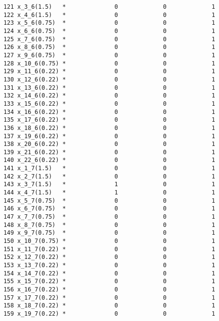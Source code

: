 \documentclass{article}[A4]
\begin{document}
\begin{verbatim}
	   121 x_3_6(1.5)   *              0             0             1 
	   122 x_4_6(1.5)   *              0             0             1 
	   123 x_5_6(0.75)  *              0             0             1 
	   124 x_6_6(0.75)  *              0             0             1 
	   125 x_7_6(0.75)  *              0             0             1 
	   126 x_8_6(0.75)  *              0             0             1 
	   127 x_9_6(0.75)  *              0             0             1 
	   128 x_10_6(0.75) *              0             0             1 
	   129 x_11_6(0.22) *              0             0             1 
	   130 x_12_6(0.22) *              0             0             1 
	   131 x_13_6(0.22) *              0             0             1 
	   132 x_14_6(0.22) *              0             0             1 
	   133 x_15_6(0.22) *              0             0             1 
	   134 x_16_6(0.22) *              0             0             1 
	   135 x_17_6(0.22) *              0             0             1 
	   136 x_18_6(0.22) *              0             0             1 
	   137 x_19_6(0.22) *              0             0             1 
	   138 x_20_6(0.22) *              0             0             1 
	   139 x_21_6(0.22) *              0             0             1 
	   140 x_22_6(0.22) *              0             0             1 
	   141 x_1_7(1.5)   *              0             0             1 
	   142 x_2_7(1.5)   *              0             0             1 
	   143 x_3_7(1.5)   *              1             0             1 
	   144 x_4_7(1.5)   *              1             0             1 
	   145 x_5_7(0.75)  *              0             0             1 
	   146 x_6_7(0.75)  *              0             0             1 
	   147 x_7_7(0.75)  *              0             0             1 
	   148 x_8_7(0.75)  *              0             0             1 
	   149 x_9_7(0.75)  *              0             0             1 
	   150 x_10_7(0.75) *              0             0             1 
	   151 x_11_7(0.22) *              0             0             1 
	   152 x_12_7(0.22) *              0             0             1 
	   153 x_13_7(0.22) *              0             0             1 
	   154 x_14_7(0.22) *              0             0             1 
	   155 x_15_7(0.22) *              0             0             1 
	   156 x_16_7(0.22) *              0             0             1 
	   157 x_17_7(0.22) *              0             0             1 
	   158 x_18_7(0.22) *              0             0             1 
	   159 x_19_7(0.22) *              0             0             1 

\end{verbatim}
\end{document}
